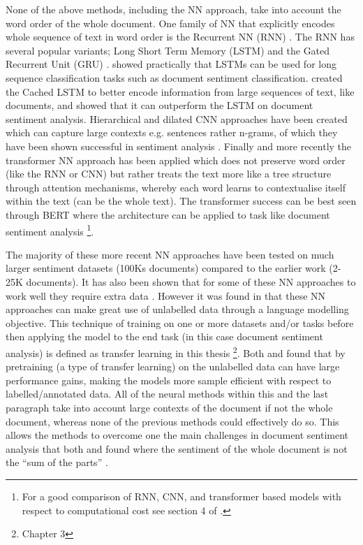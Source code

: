 None of the above methods, including the NN approach, take into account the word order of the whole document. One family of NN that explicitly encodes whole sequence of text in word order is the Recurrent NN (RNN) \citep{rumelhart1985learning}. The RNN has several popular variants; Long Short Term Memory (LSTM) \citep{hochreiter1997long} and the Gated Recurrent Unit (GRU) \citep{cho-etal-2014-learning}. \citet{dai2015semi} showed practically that LSTMs can be used for long sequence classification tasks such as document sentiment classification. \citet{xu-etal-2016-cached} created the Cached LSTM to better encode information from large sequences of text, like documents, and showed that it can outperform the LSTM on document sentiment analysis. Hierarchical \citep{zhang2015character} and dilated \citep{strubell-etal-2017-fast} CNN approaches have been created which can capture large contexts e.g. sentences rather n-grams, of which they have been shown successful in sentiment analysis \citep{conneau-etal-2017-deep}. Finally and more recently the transformer NN \citep{vaswani2017attention} approach has been applied which does not preserve word order (like the RNN or CNN) but rather treats the text more like a tree structure through attention mechanisms, whereby each word learns to contextualise itself within the text (can be the whole text). The transformer success can be best seen through BERT \citep{devlin-etal-2019-bert} where the architecture can be applied to task like document sentiment analysis \citep{sun2019fine}\footnote{For a good comparison of RNN, CNN, and transformer based models with respect to computational cost see section 4 of \citet{vaswani2017attention}.}. 

The majority of these more recent NN approaches have been tested on much larger sentiment datasets (100Ks documents) compared to the earlier work (2-25K documents). It has also been shown that for some of these NN approaches to work well they require extra data \citep{dai2015semi}. However it was found in \citet{dai2015semi} that these NN approaches can make great use of unlabelled data through a language modelling objective. This technique of training on one or more datasets and/or tasks before then applying the model to the end task (in this case document sentiment analysis) is defined as transfer learning in this thesis \citep{ruder2019neural}\footnote{Chapter 3}.  Both \citet{howard-ruder-2018-universal} and \citet{sun2019fine} found that by pretraining (a type of transfer learning) on the unlabelled data can have large performance gains, making the models more sample efficient with respect to labelled/annotated data. All of the neural methods within this and the last paragraph take into account large contexts of the document if not the whole document, whereas none of the previous methods could effectively do so. This allows the methods to overcome one the main challenges in document sentiment analysis that both \citet{turney-2002-thumbs} and \citet{pang-etal-2002-thumbs} found where the sentiment of the whole document is not the ``sum of the parts'' \citep{turney-2002-thumbs}.

